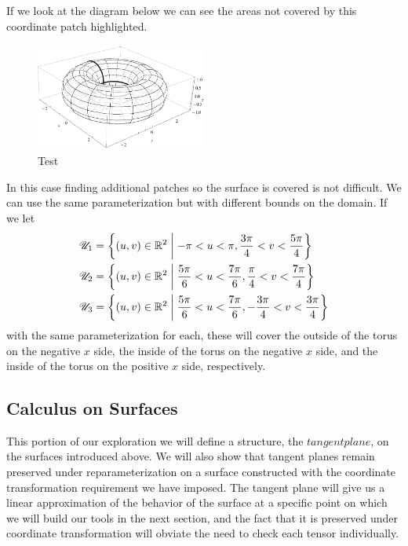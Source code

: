 If we look at the diagram below we can see the areas not covered by this coordinate patch highlighted.
\begin{figure}[t] %
  \centering
  \includegraphics[width=0.5\textwidth]{figures/torus.pdf}
  \caption{Test}
\end{figure}
In this case finding additional patches so the surface is covered is not difficult. We can use the same parameterization but with different bounds on the domain. If we let
\begin{align*}
  \mathscr{U}_1 &= \left\{(u, v) \in \mathbb{R}^2\;\middle\vert\;-\pi < u < \pi, \frac{3\pi}{4} < v < \frac{5\pi}{4}\right\}\\
  \mathscr{U}_2 &= \left\{(u, v) \in \mathbb{R}^2\;\middle\vert\;\frac{5\pi}{6} < u < \frac{7\pi}{6}, \frac{\pi}{4} < v < \frac{7\pi}{4}\right\}\\
  \mathscr{U}_3 &= \left\{(u, v) \in \mathbb{R}^2\;\middle\vert\;\frac{5\pi}{6} < u < \frac{7\pi}{6}, -\frac{3\pi}{4} < v < \frac{3\pi}{4}\right\}
\end{align*}
with the same parameterization for each, these will cover the outside of the torus on the negative $x$ side, the inside of the torus on the negative $x$ side, and the inside of the torus on the positive $x$ side, respectively.



\subsection{Calculus on Surfaces}

This portion of our exploration we will define a structure, the $tangent plane$, on the surfaces introduced above. We will also show that tangent planes remain preserved under reparameterization on a surface constructed with the coordinate transformation requirement we have imposed. The tangent plane will give us a linear approximation of the behavior of the surface at a specific point on which we will build our tools in the next section, and the fact that it is preserved under coordinate transformation will obviate the need to check each tensor individually.

